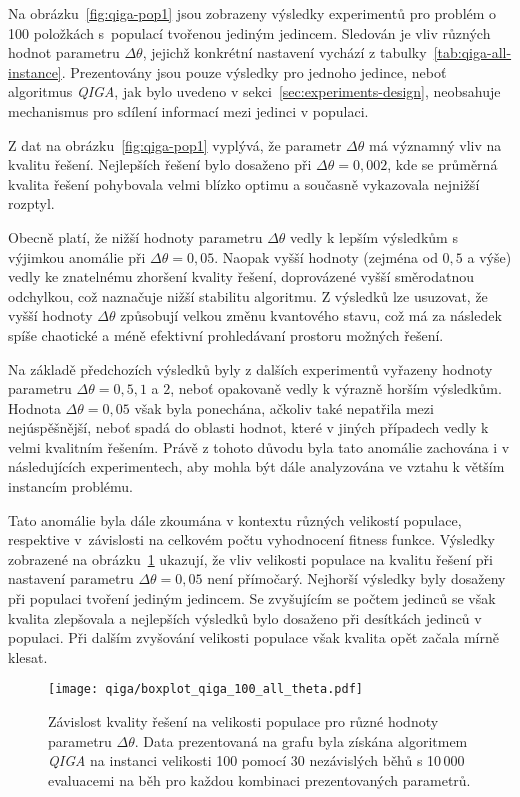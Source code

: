 Na obrázku~\ref{fig:qiga-pop1} jsou zobrazeny výsledky experimentů pro problém o 100 položkách s~populací tvořenou jediným jedincem.
Sledován je vliv různých hodnot parametru $\Delta\theta$, jejichž konkrétní nastavení vychází z tabulky~\ref{tab:qiga-all-instance}. 
Prezentovány jsou pouze výsledky pro jednoho jedince, neboť algoritmus \emph{QIGA}, jak bylo uvedeno v sekci~\ref{sec:experiments-design}, neobsahuje mechanismus pro sdílení informací mezi jedinci v populaci. 

Z dat na obrázku~\ref{fig:qiga-pop1} vyplývá, že parametr $\Delta\theta$ má významný vliv na kvalitu řešení. 
Nejlepších řešení bylo dosaženo při $\Delta\theta = 0{,}002$, kde se průměrná kvalita řešení pohybovala velmi blízko optimu a současně vykazovala nejnižší rozptyl. 

Obecně platí, že nižší hodnoty parametru $\Delta\theta$ vedly k lepším výsledkům s výjimkou anomálie při $\Delta\theta = 0{,}05$. 
Naopak vyšší hodnoty (zejména od $0{,}5$ a výše) vedly ke znatelnému zhoršení kvality řešení, doprovázené vyšší směrodatnou odchylkou, což naznačuje nižší stabilitu algoritmu. 
Z výsledků lze usuzovat, že vyšší hodnoty $\Delta\theta$ způsobují velkou změnu kvantového stavu, což má za následek spíše chaotické a méně efektivní prohledávaní prostoru možných řešení. 

Na základě předchozích výsledků byly z dalších experimentů vyřazeny hodnoty parametru $\Delta\theta = 0{,}5, 1$ a $2$, neboť opakovaně vedly k výrazně horším výsledkům. 
Hodnota $\Delta\theta = 0{,}05$ však byla ponechána, ačkoliv také nepatřila mezi nejúspěšnější, neboť spadá do oblasti hodnot, které v jiných případech vedly k velmi kvalitním řešením. 
Právě z tohoto důvodu byla tato anomálie zachována i v následujících experimentech, aby mohla být dále analyzována ve vztahu k větším instancím problému. 

Tato anomálie byla dále zkoumána v kontextu různých velikostí populace, respektive v~závislosti na celkovém počtu vyhodnocení fitness funkce. 
Výsledky zobrazené na obrázku~\ref{fig:qiga-100-all} ukazují, že vliv velikosti populace na kvalitu řešení při nastavení parametru $\Delta\theta = 0{,}05$ není přímočarý. 
Nejhorší výsledky byly dosaženy při populaci tvoření jediným jedincem. 
Se zvyšujícím se počtem jedinců se však kvalita zlepšovala a nejlepších výsledků bylo dosaženo při desítkách jedinců v populaci. 
Při dalším zvyšování velikosti populace však kvalita opět začala mírně klesat.

\begin{figure}[ht!]
    \centering
    \texttt{[image: qiga/boxplot\_qiga\_100\_all\_theta.pdf]}
    \caption{Závislost kvality řešení na velikosti populace pro různé hodnoty parametru $\Delta\theta$. Data prezentovaná na grafu byla získána algoritmem \emph{QIGA} na instanci velikosti 100 pomocí 30 nezávislých běhů s 10\,000 evaluacemi na běh pro každou kombinaci prezentovaných parametrů.}
    \label{fig:qiga-100-all}
\end{figure}

